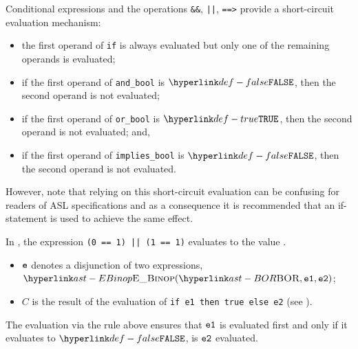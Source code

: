 
Conditional expressions and the operations \texttt{\&\&}, \texttt{||},
\texttt{==>} provide a short-circuit evaluation mechanism:

\begin{itemize}
\item the first operand of \texttt{if} is always evaluated but only one of the
remaining operands is evaluated;
\item if the first operand of \texttt{and\_bool} is $\False$, then the second operand is not evaluated;
\item if the first operand of \texttt{or\_bool} is $\True$, then the second operand is not evaluated; and,
\item if the first operand of \texttt{implies\_bool} is $\False$, then the
second operand is not evaluated.
\end{itemize}

However, note that relying on this short-circuit evaluation can be confusing
for readers of ASL specifications and as a consequence it is recommended that
an if-statement is used to achieve the same effect.

In , the expression \texttt{(0 == 1) || (1 == 1)} evaluates to the value \True.

\ProseParagraph
\AllApply
\begin{itemize}
\item $\ve$ denotes a disjunction of two expressions, $\EBinop(\BOR, \veone, \vetwo)$;
\item $C$ is the result of the evaluation of
      \texttt{if e1 then true else e2} (see ).
\end{itemize}

\FormallyParagraph
\begin{mathpar}
\end{mathpar}

The evaluation via the rule above ensures that $\veone$ is evaluated first and only if
it evaluates to $\False$, is $\vetwo$ evaluated.

